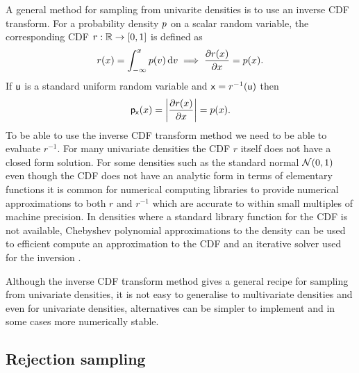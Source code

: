 A general method for sampling from univarite densities is to use an inverse \ac{CDF} transform. For a probability density $p$ on a scalar random variable, the corresponding \ac{CDF} $r : \mathbb{R} \to [0,1]$ is defined as
\begin{equation}
  r(x) = \int_{-\infty}^x p(v) \,\mathrm{d} v
  \implies
  \frac{\partial r(x)}{\partial x} = p(x).
\end{equation}
If $\mathsf{u}$ is a standard uniform random variable and $\mathsf{x} = r^{-1}(\mathsf{u})$ then
\begin{equation}
  \pden{\rvar{x}}(x) = \left|\pd{r(x)}{x}\right| = \tgtdens(x).
\end{equation}
To be able to use the inverse \ac{CDF} transform method we need to be able to evaluate $r^{-1}$. For many univariate densities the \ac{CDF} $r$ itself does not have a closed form solution. For some densities such as the standard normal $\nrm{0,1}$ even though the \ac{CDF} does not have an analytic form in terms of elementary functions it is common for numerical computing libraries to provide numerical approximations to both $r$ and $r^{-1}$ which are accurate to within small multiples of machine precision. In densities where a standard library function for the \ac{CDF} is not available, Chebyshev polynomial approximations to the density can be used to efficient compute an approximation to the \ac{CDF} and an iterative solver used for the inversion \citep{olver2013fast}.


Although the inverse \ac{CDF} transform method gives a general recipe for sampling from univariate densities, it is not easy to generalise to multivariate densities and even for univariate densities, alternatives can be simpler to implement and in some cases more numerically stable.

\subsection{Rejection sampling}


